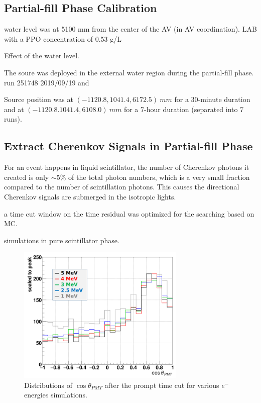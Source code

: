 \subsection{Partial-fill Phase Calibration}

water level was at 5100 mm from the center of the AV (in AV coordination).
LAB with a PPO concentration of 0.53 g/L  

Effect of the water level.



The  soure was deployed in the external water region during the partial-fill phase.
run 251748 2019/09/19 and 


Source position was at $(-1120.8, 1041.4, 6172.5)~ mm$ for a 30-minute duration and at $(-1120.8. 1041.4, 6108.0)~mm$ for a 7-hour duration (separated into 7 runs).

\subsection{Extract Cherenkov Signals in Partial-fill Phase}

For an event happens in liquid scintillator, the number of Cherenkov photons it created is only $\sim 5\%$ 
of the total photon numbers, which is a very small fraction compared to the number of scintillation photons. This causes the directional Cherenkov signals are submerged in the isotropic lights.








a time cut window on the time residual was optimized for the searching based on MC.

simulations in pure scintillator phase.











 
\begin{figure}[!htb]
	\centering
	\includegraphics[width=8cm]{cherenkov_scint_variousE.png}
	\caption{Distributions of $\cos\theta_{PMT}$ after the prompt time cut for various $e^-$ energies simulations.}
	\label{cherenkov_variousE}
\end{figure}


